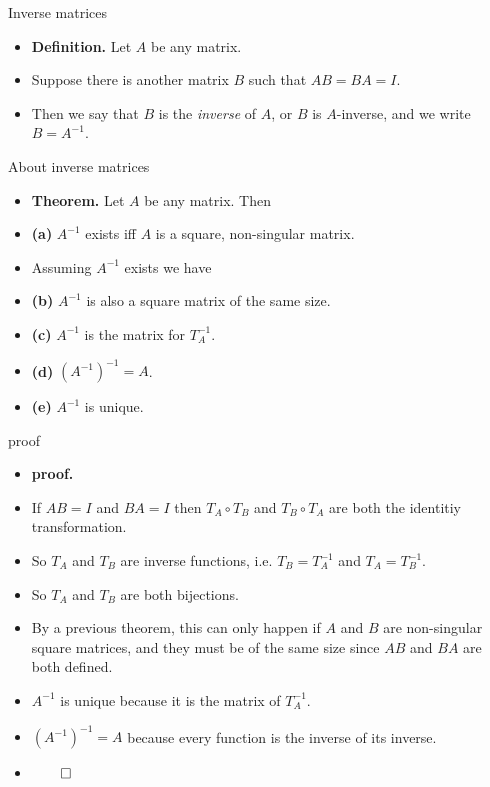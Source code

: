 \documentclass{beamer}
\begin{document}
\begin{frame}{Inverse matrices}

\begin{itemize}
\item \textbf{Definition.} Let $A$ be any matrix.
\item Suppose there is another matrix $B$ such that $AB = BA = I$.
\item Then we say that $B$ is the \emph{inverse} of $A$, or $B$ is $A$-inverse,
and we write $B=A^{-1}$.
\end{itemize}
\end{frame}

\begin{frame}{About inverse matrices}

\begin{itemize}
\item \textbf{Theorem.} Let $A$ be any matrix. Then
\item \textbf{(a)} $A^{-1}$ exists iff $A$ is a square, non-singular matrix.
\item Assuming $A^{-1}$ exists we have
\item \textbf{(b)} $A^{-1}$ is also a square matrix of the same size.
\item \textbf{(c)} $A^{-1}$ is the matrix for $T^{-1}_A$.
\item \textbf{(d)} $\left(A^{-1}\right)^{-1} = A$.
\item \textbf{(e)} $A^{-1}$ is unique.
\end{itemize}
\end{frame}


\begin{frame}{proof}

\begin{itemize}
\item \textbf{proof.}
\item If $AB=I$ and $BA=I$ then $T_A\circ T_B$ and $T_B\circ T_A$ are both
the identitiy transformation.
\item So $T_A$ and $T_B$ are inverse functions, i.e. $T_B = T_A^{-1}$ and $T_A=T_B^{-1}$.
\item So $T_A$ and $T_B$ are both bijections.
\item By a previous theorem, this can only happen if $A$ and $B$ are non-singular
square matrices, and they must be of the same size since $AB$ and $BA$ are both defined.
\item $A^{-1}$ is unique because it is the matrix of $T_A^{-1}$.
\item $\left(A^{-1}\right)^{-1} = A$ because every function is the inverse of its inverse.
\item $\qed$
\end{itemize}
\end{frame}
\end{document}
